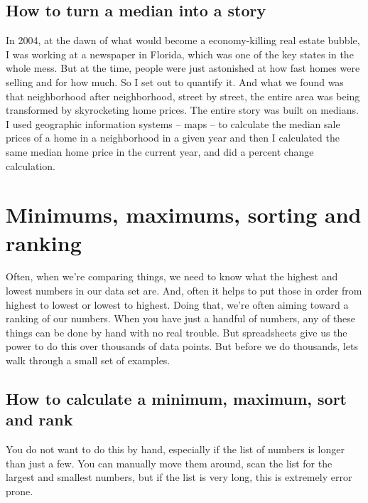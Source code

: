 \documentclass[
]{book}
\begin{document}
\hypertarget{how-to-turn-a-median-into-a-story}{%
\section{How to turn a median into a story}\label{how-to-turn-a-median-into-a-story}}

In 2004, at the dawn of what would become a economy-killing real estate bubble, I was working at a newspaper in Florida, which was one of the key states in the whole mess. But at the time, people were just astonished at how fast homes were selling and for how much. So I set out to quantify it. And what we found was that neighborhood after neighborhood, street by street, the entire area was being transformed by skyrocketing home prices. The entire story was built on medians. I used geographic information systems -- maps -- to calculate the median sale prices of a home in a neighborhood in a given year and then I calculated the same median home price in the current year, and did a percent change calculation.

\hypertarget{minimums-maximums-sorting-and-ranking}{%
\chapter{Minimums, maximums, sorting and ranking}\label{minimums-maximums-sorting-and-ranking}}

Often, when we're comparing things, we need to know what the highest and lowest numbers in our data set are. And, often it helps to put those in order from highest to lowest or lowest to highest. Doing that, we're often aiming toward a ranking of our numbers. When you have just a handful of numbers, any of these things can be done by hand with no real trouble. But spreadsheets give us the power to do this over thousands of data points. But before we do thousands, lets walk through a small set of examples.

\hypertarget{how-to-calculate-a-minimum-maximum-sort-and-rank}{%
\section{How to calculate a minimum, maximum, sort and rank}\label{how-to-calculate-a-minimum-maximum-sort-and-rank}}

You do not want to do this by hand, especially if the list of numbers is longer than just a few. You can manually move them around, scan the list for the largest and smallest numbers, but if the list is very long, this is extremely error prone.
\end{document}
